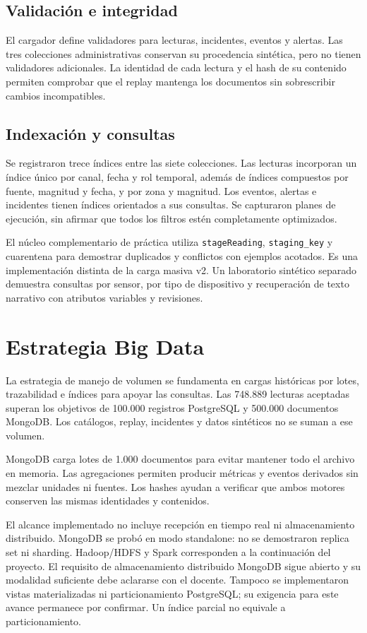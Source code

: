 \documentclass[12pt,letterpaper]{article}
\begin{document}
\subsection{Validación e integridad}
El cargador  define validadores para
lecturas, incidentes, eventos y alertas. Las tres colecciones administrativas
conservan su procedencia sintética, pero no tienen validadores adicionales.
La identidad de cada lectura y el hash de su contenido permiten comprobar que
el replay mantenga los documentos sin sobrescribir cambios incompatibles.

\subsection{Indexación y consultas}
Se registraron trece índices entre las siete colecciones. Las lecturas incorporan
un índice único por canal, fecha y rol temporal, además de índices compuestos
por fuente, magnitud y fecha, y por zona y magnitud. Los eventos, alertas e
incidentes tienen índices orientados a sus consultas. Se capturaron planes de
ejecución, sin afirmar que todos los filtros estén completamente optimizados.

El núcleo complementario de práctica utiliza \texttt{stageReading},
\texttt{staging\_key} y cuarentena para demostrar duplicados y conflictos con
ejemplos acotados. Es una implementación distinta de la carga masiva v2.
Un laboratorio sintético separado demuestra consultas por sensor, por tipo de
dispositivo y recuperación de texto narrativo con atributos variables y revisiones.

\section{Estrategia Big Data}

La estrategia de manejo de volumen se fundamenta en cargas históricas por lotes,
trazabilidad e índices para apoyar las consultas. Las 748.889 lecturas aceptadas
superan los objetivos de 100.000 registros PostgreSQL y 500.000 documentos MongoDB.
Los catálogos, replay, incidentes y datos sintéticos no se suman a ese volumen.

MongoDB carga lotes de 1.000 documentos para evitar mantener todo el archivo en
memoria. Las agregaciones permiten producir métricas y eventos derivados sin
mezclar unidades ni fuentes. Los hashes ayudan a verificar que ambos motores
conserven las mismas identidades y contenidos.

El alcance implementado no incluye recepción en tiempo real ni almacenamiento
distribuido. MongoDB se probó en modo standalone: no se demostraron replica set
ni sharding. Hadoop/HDFS y Spark corresponden a la continuación del proyecto.
El requisito de almacenamiento distribuido MongoDB sigue abierto y su modalidad
suficiente debe aclararse con el docente. Tampoco se implementaron vistas
materializadas ni particionamiento PostgreSQL; su exigencia para este avance
permanece por confirmar. Un índice parcial no equivale a particionamiento.
\end{document}
